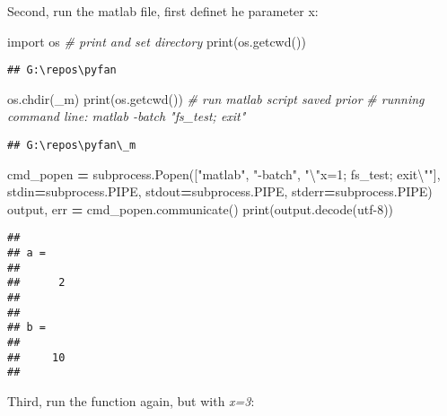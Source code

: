 \documentclass[
]{book}
\newenvironment{Shaded}{\begin{snugshade}}{\end{snugshade}}
\newcommand{\BuiltInTok}[1]{#1}
\newcommand{\CharTok}[1]{\textcolor[rgb]{0.31,0.60,0.02}{#1}}
\newcommand{\CommentTok}[1]{\textcolor[rgb]{0.56,0.35,0.01}{\textit{#1}}}
\newcommand{\ImportTok}[1]{#1}
\newcommand{\NormalTok}[1]{#1}
\newcommand{\OperatorTok}[1]{\textcolor[rgb]{0.81,0.36,0.00}{\textbf{#1}}}
\newcommand{\StringTok}[1]{\textcolor[rgb]{0.31,0.60,0.02}{#1}}
\begin{document}
Second, run the matlab file, first definet he parameter x:

\begin{Shaded}
\begin{Highlighting}[]
\ImportTok{import}\NormalTok{ os}
\CommentTok{\# print and set directory}
\BuiltInTok{print}\NormalTok{(os.getcwd())}
\end{Highlighting}
\end{Shaded}

\begin{verbatim}
## G:\repos\pyfan
\end{verbatim}

\begin{Shaded}
\begin{Highlighting}[]
\NormalTok{os.chdir(}\StringTok{\textquotesingle{}\_m\textquotesingle{}}\NormalTok{)}
\BuiltInTok{print}\NormalTok{(os.getcwd())}
\CommentTok{\# run matlab script saved prior}
\CommentTok{\# running command line: matlab {-}batch "fs\_test; exit"}
\end{Highlighting}
\end{Shaded}

\begin{verbatim}
## G:\repos\pyfan\_m
\end{verbatim}

\begin{Shaded}
\begin{Highlighting}[]
\NormalTok{cmd\_popen }\OperatorTok{=}\NormalTok{ subprocess.Popen([}\StringTok{"matlab"}\NormalTok{, }\StringTok{"{-}batch"}\NormalTok{, }\StringTok{"}\CharTok{\textbackslash{}"}\StringTok{x=1; fs\_test; exit}\CharTok{\textbackslash{}"}\StringTok{"}\NormalTok{],}
\NormalTok{                             stdin}\OperatorTok{=}\NormalTok{subprocess.PIPE,}
\NormalTok{                             stdout}\OperatorTok{=}\NormalTok{subprocess.PIPE,}
\NormalTok{                             stderr}\OperatorTok{=}\NormalTok{subprocess.PIPE)}
\NormalTok{output, err }\OperatorTok{=}\NormalTok{ cmd\_popen.communicate()}
\BuiltInTok{print}\NormalTok{(output.decode(}\StringTok{\textquotesingle{}utf{-}8\textquotesingle{}}\NormalTok{))}
\end{Highlighting}
\end{Shaded}

\begin{verbatim}
## 
## a =
## 
##      2
## 
## 
## b =
## 
##     10
## 
\end{verbatim}

Third, run the function again, but with \emph{x=3}:
\end{document}

